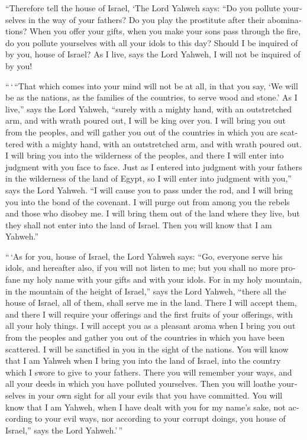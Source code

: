 \begin{paracol}{2}
\begin{otherlanguage}{english}
 ``Therefore tell the house of Israel, `The Lord Yahweh
says: ``Do you pollute yourselves in the way of your fathers? Do you
play the prostitute after their abominations?  When you
offer your gifts, when you make your sons pass through the fire, do you
pollute yourselves with all your idols to this day? Should I be inquired
of by you, house of Israel? As I live, says the Lord Yahweh, I will not
be inquired of by you!

 ``\,`\,``That which comes into your mind will not be at
all, in that you say, `We will be as the nations, as the families of the
countries, to serve wood and stone.'  As I live,'' says
the Lord Yahweh, ``surely with a mighty hand, with an outstretched arm,
and with wrath poured out, I will be king over you.  I
will bring you out from the peoples, and will gather you out of the
countries in which you are scattered with a mighty hand, with an
outstretched arm, and with wrath poured out.  I will
bring you into the wilderness of the peoples, and there I will enter
into judgment with you face to face.  Just as I entered
into judgment with your fathers in the wilderness of the land of Egypt,
so I will enter into judgment with you,'' says the Lord Yahweh.
 ``I will cause you to pass under the rod, and I will
bring you into the bond of the covenant.  I will purge
out from among you the rebels and those who disobey me. I will bring
them out of the land where they live, but they shall not enter into the
land of Israel. Then you will know that I am Yahweh.''

 ``\,`As for you, house of Israel, the Lord Yahweh says:
``Go, everyone serve his idols, and hereafter also, if you will not
listen to me; but you shall no more profane my holy name with your gifts
and with your idols.  For in my holy mountain, in the
mountain of the height of Israel,'' says the Lord Yahweh, ``there all
the house of Israel, all of them, shall serve me in the land. There I
will accept them, and there I will require your offerings and the first
fruits of your offerings, with all your holy things.  I
will accept you as a pleasant aroma when I bring you out from the
peoples and gather you out of the countries in which you have been
scattered. I will be sanctified in you in the sight of the nations.
 You will know that I am Yahweh when I bring you into the
land of Israel, into the country which I swore to give to your fathers.
 There you will remember your ways, and all your deeds in
which you have polluted yourselves. Then you will loathe yourselves in
your own sight for all your evils that you have committed.
 You will know that I am Yahweh, when I have dealt with
you for my name's sake, not according to your evil ways, nor according
to your corrupt doings, you house of Israel,'' says the Lord
Yahweh.'\,''


\end{otherlanguage}
\end{paracol}
